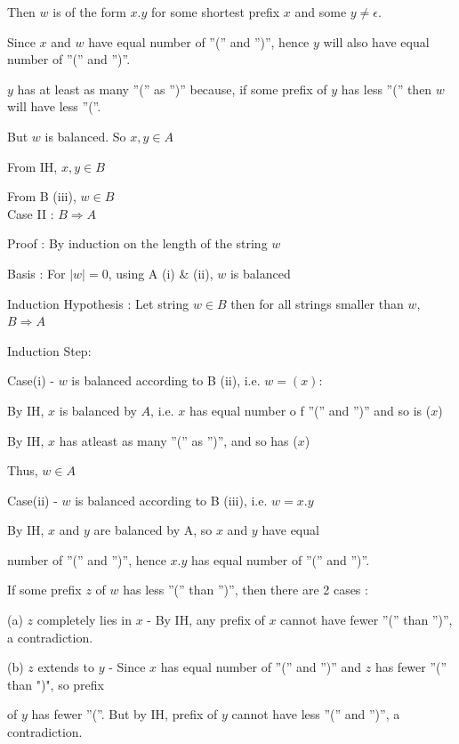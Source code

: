 \documentclass{article}
\begin{document}
    \qquad Then $w$ is of the form $x.y$ for some shortest prefix $x$ and some $y \neq \epsilon$.
    
    \qquad Since $x$ and $w$ have equal number of ”(” and ”)”, hence $y$ will also have equal number of ”(” and ”)”.
    
    \qquad $y$ has at least as many ”(” as ”)” because, if some prefix of $y$ has less ”(” then $w$ will have less ”(”.
    
    \qquad But $w$ is balanced. So $x, y \in A$
    
    \qquad From IH, $x, y \in B$
    
    \qquad From B (iii), $w \in B$\\


Case II : $B \Longrightarrow A$
    
    Proof : By induction on the length of the string $w$
    
    Basis : For $|w| = 0$, using A (i) \& (ii), $w$ is balanced
    
    Induction Hypothesis : Let string $w \in B$ then for all strings smaller than $w$, $B \Longrightarrow A$
    
    Induction Step:
    
    \quad Case(i) - $w$ is balanced according to B (ii), i.e. $w = (x)$: 
    
    \qquad By IH, $x$ is balanced by $A$, i.e. $x$ has equal number o f ”(” and ”)” and so is ($x$)
    
    \qquad By IH, $x$ has atleast as many ”(” as ”)”, and so has ($x$)
    
    \qquad Thus, $w \in A$
    
    \quad Case(ii) - $w$ is balanced according to B (iii), i.e. $w = x.y$
    
    \qquad By IH, $x$ and $y$ are balanced by A, so $x$ and $y$ have equal 
    
    \qquad number of ”(” and ”)”, hence $x.y$ has equal number of ”(” and ”)”.
    
    \qquad If some prefix $z$ of $w$ has less ”(” than ”)”, then there are 2 cases :
    
    \quad \qquad (a) $z$ completely lies in $x$ - By IH, any prefix of $x$ cannot have fewer ”(” than ”)”, a contradiction.

    \quad \qquad (b) $z$ extends to $y$ -  Since $x$ has equal number of ”(” and ”)” and $z$ has fewer ”(” than ")", so prefix 
    
    \quad \qquad of $y$ has fewer ”(”. But by IH, prefix of $y$ cannot have less ”(” and ”)”, a contradiction.
    
\end{document}
